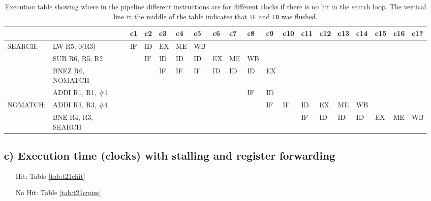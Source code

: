\begin{landscape}
    \begin{table}[]
    \centering
    \begin{tabular}{lllllllllllllllllll}
    \hline
             &                                         & c1 & c2 & c3 & c4 & c5 & c6 & c7 & c8 & c9                      & c10 & c11 & c12 & c13 & c14 & c15 & c16 & c17 \\ \hline
    SEARCH:  & \multicolumn{1}{l|}{LW R5, 0(R3)}       & IF & ID & EX & ME & WB &    &    &    &                         &     &     &     &     &     &     &     &    \\
             & \multicolumn{1}{l|}{SUB R6, R5, R2}     &    & IF & ID & ID & ID & EX & ME & WB &                         &     &     &     &     &     &     &     &     \\
             & \multicolumn{1}{l|}{BNEZ R6, NOMATCH}   &    &    & IF & IF & IF & ID & ID & ID & \multicolumn{1}{l|}{EX} &     &     &     &     &     &     &     &     \\
             & \multicolumn{1}{l|}{ADDI R1, R1, \#1}   &    &    &    &    &    &    &    & IF & \multicolumn{1}{l|}{ID} &     &     &     &     &     &     &     &     \\
    NOMATCH: & \multicolumn{1}{l|}{ADDI R3, R3, \#4}   &    &    &    &    &    &    &    &    & \multicolumn{1}{l|}{IF} & IF  & ID  & EX  & ME  & WB  &     &     &     \\
             & \multicolumn{1}{l|}{BNE R4, R3, SEARCH} &    &    &    &    &    &    &    &    &                         &     & IF  & ID  & ID  & ID  & EX  & ME  & WB  \\ \hline
    \end{tabular}
    \caption{Execution table showing where in the pipeline different instructions are for different clocks if there is no hit in the search loop. The vertical line in the middle of the table indicates that \texttt{IF} and \texttt{ID} was flushed.}
    \label{tab:t21bmiss}
    \end{table}
\end{landscape}


\subsection{c) Execution time (clocks) with stalling and register forwarding}
\begin{itemize}
    \item[Hit: ] Table \ref{tab:t21chit}

    \item[No Hit: ] Table \ref{tab:t21cmiss}
\end{itemize}

